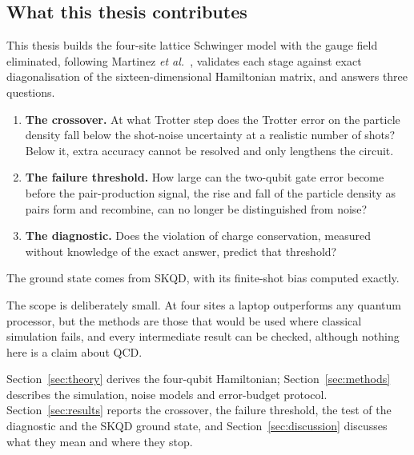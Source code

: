 \subsection{What this thesis contributes}
\label{sec:contribution}

This thesis builds the four-site lattice Schwinger model with the gauge field
eliminated, following Martinez \emph{et al.}~\cite{martinez2016}, validates
each stage against exact diagonalisation of the sixteen-dimensional Hamiltonian
matrix, and answers three questions.
\begin{enumerate}
  \item \textbf{The crossover.} At what Trotter step does the Trotter
  error on the particle density fall below the shot-noise uncertainty at a
  realistic number of shots? Below it, extra accuracy cannot be resolved and
  only lengthens the circuit.
  \item \textbf{The failure threshold.} How large can the two-qubit gate error
  become before the pair-production signal, the rise and fall of the particle
  density as pairs form and recombine, can no longer be distinguished from
  noise?
  \item \textbf{The diagnostic.} Does the violation of charge conservation,
  measured without knowledge of the exact answer, predict that threshold?
\end{enumerate}
The ground state comes from SKQD, with its finite-shot bias computed exactly.

The scope is deliberately small. At four sites a laptop outperforms any quantum
processor, but the methods are those that would be used where classical
simulation fails, and every intermediate result can be checked, although
nothing here is a claim about QCD.

Section~\ref{sec:theory} derives the four-qubit Hamiltonian;
Section~\ref{sec:methods} describes the simulation, noise models and
error-budget protocol.
\ifdefined\fullthesis
Section~\ref{sec:results} reports the crossover, the failure threshold, the test
of the diagnostic and the SKQD ground state, and Section~\ref{sec:discussion}
discusses what they mean and where they stop.
\fi
